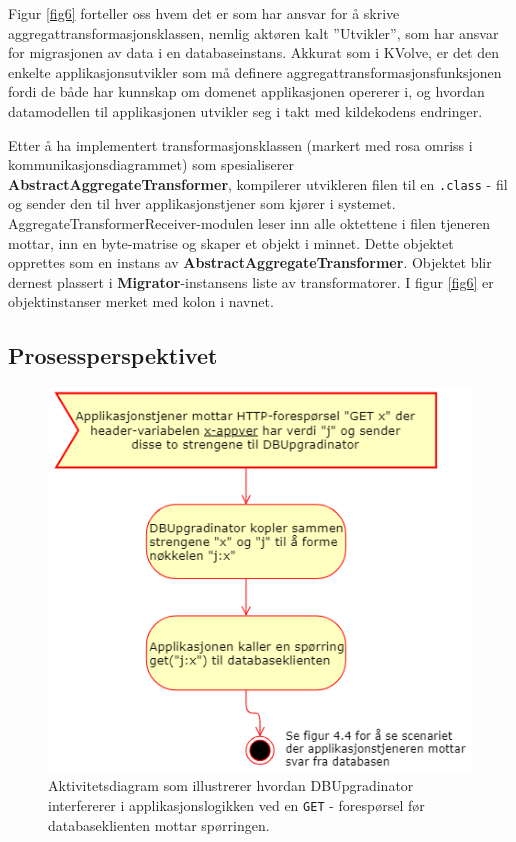 Figur \ref{fig6} forteller oss hvem det er som har ansvar for å skrive aggregat\-transformasjonsklassen, nemlig aktøren kalt ''Utvikler'', som har ansvar for migrasjonen av data i en databaseinstans. Akkurat som i KVolve, er det den enkelte applikasjonsutvikler som må definere aggregat\-transformasjons\-funksjonen fordi de både har kunnskap om domenet applikasjonen opererer i, og hvordan datamodellen til applikasjonen utvikler seg i takt med kildekodens endringer.

Etter å ha implementert transformasjonsklassen (markert med rosa omriss i kommunikasjonsdiagrammet) som spesialiserer \textbf{AbstractAggregateTransformer}, kompilerer utvikleren filen til en \texttt{.class} - fil og sender den til hver applikasjonstjener som kjører i systemet. AggregateTransformerReceiver-modulen leser inn alle oktettene i filen tjeneren mottar, inn en byte-matrise og skaper et objekt i minnet. Dette objektet opprettes som en instans av \textbf{AbstractAggregateTransformer}. Objektet blir dernest plassert i \textbf{Migrator}-instansens liste av transformatorer. I figur \ref{fig6} er objektinstanser merket med kolon i navnet.

\subsection{Prosessperspektivet}

\begin{figure}[hbtp]
  \centering
  \includegraphics[scale=0.8]{fig/dbupgradinator-prosess-1.png}
  \caption{Aktivitetsdiagram som illustrerer hvordan DBUpgradinator interfererer i applikasjonslogikken ved en \texttt{GET} - forespørsel før databaseklienten mottar spørringen.}
  \label{fig7}
\end{figure}

